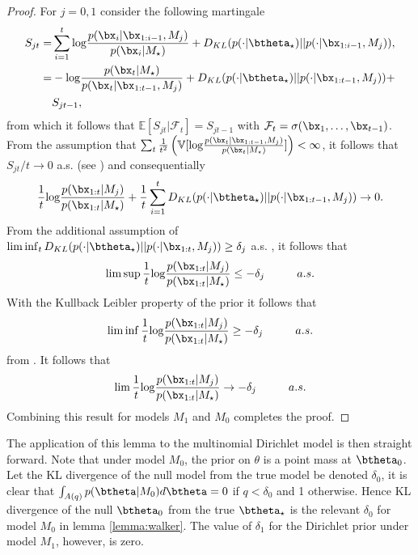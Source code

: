 \documentclass[11pt]{article}
\def\log{{\rm log}}
\begin{document}
\begin{proof}
  For $j=0,1$ consider the following martingale
  \begin{align*}
    \label{eq:walker_martingale}
    S_{jt} =& \sum_{i=1}^{t} \log \frac{p(\bx_i|\bx_{1:i-1},M_j)}{p(\bx_i|M_\star)} + D_{KL}(p(\cdot|\btheta_\star)||p(\cdot|\bx_{1:i-1}, M_j) ),\\
    =& -\log \frac{p(\bx_t|M_\star)}{p(\bx_t|\bx_{1:t-1},M_j)} + D_{KL}(p(\cdot|\btheta_\star)||p(\cdot|\bx_{1:t-1}, M_j) ) +\\
    &S_{jt-1},\\
  \end{align*}
  from which it follows that $\mathbb{E}[S_{jt}|\mathcal{F}_t] = S_{jt-1}$ with $\mathcal{F}_t = \sigma(\bx_1,\dots,\bx_{t-1})$.
From the assumption that  $\sum_t \frac{1}{t^2} \left( \mathbb{V}[\log \frac{p(\bx_t|\bx_{1:t-1},M_j)}{p(\bx_t|M_\star )}]\right) < \infty$, it follows that $S_{jt}/t \rightarrow 0$ a.s. (see \cite {loeve})
and consequentially
  \begin{align*}
    \frac{1}{t} \log \frac{p(\bx_{1:t}|M_j)}{p(\bx_{1:t}|M_\star)} + \frac{1}{t}\sum_{i=1}^t  D_{KL}(p(\cdot|\btheta_\star)||p(\cdot|\bx_{1:t-1}, M_j) )\rightarrow 0.
  \end{align*}
  From the additional assumption of $\lim \inf_t D_{KL}(p(\cdot|\btheta_\star)||p(\cdot|\bx_{1:t}, M_j) ) \geq \delta_j$ a.s.
, it follows that
  \begin{align*}
    \lim \sup   \frac{1}{t} \log \frac{p(\bx_{1:t}|M_j)}{p(\bx_{1:t}|M_\star)} \leq - \delta_j \hspace{1cm} a.s.
  \end{align*}
  With the Kullback Leibler property of the prior it follows that
  \begin{align*}
     \lim \inf   \frac{1}{t} \log \frac{p(\bx_{1:t}|M_j)}{p(\bx_{1:t}|M_\star)} \geq - \delta_j \hspace{1cm} a.s.
  \end{align*}
  from \cite{barron}.
It follows that
    \begin{align*}
     \lim   \frac{1}{t} \log \frac{p(\bx_{1:t}|M_j)}{p(\bx_{1:t}|M_\star)} \rightarrow - \delta_j \hspace{1cm} a.s.
    \end{align*}
    Combining this result for models $M_1$ and $M_0$ completes the proof.
\end{proof}

The application of this lemma to the multinomial Dirichlet model is then straight forward.
Note that under model $M_0$, the prior on $\theta$ is a point mass at $\btheta_0$.
Let the KL divergence of the null model from the true model be denoted $\delta_0$, it is clear that $\int_{A(q)} p(\btheta|M_0) d\btheta = 0$ if $q<\delta_0$ and 1 otherwise.
Hence KL divergence of the null $\btheta_0$ from the true $\btheta_\star$ is the relevant $\delta_0$ for model $M_0$ in lemma \ref{lemma:walker}.
The value of $\delta_1$ for the Dirichlet prior under model $M_1$, however, is zero.
\end{document}
